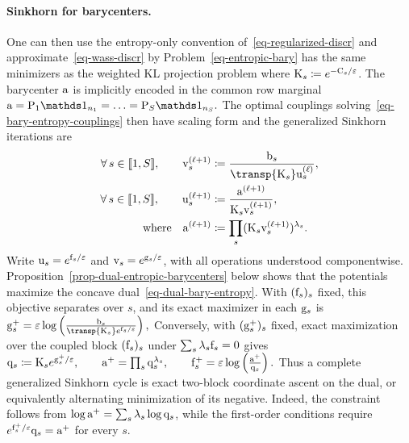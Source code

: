 \paragraph{Sinkhorn for barycenters.}
One can then use the entropy-only convention of~\eqref{eq-regularized-discr} and approximate~\eqref{eq-wass-discr} by
Problem~\eqref{eq-entropic-bary} has the same minimizers as the weighted KL projection problem
where $\mathrm{K}_s\coloneqq e^{-\mathrm{C}_s/\varepsilon}$. The barycenter $\mathrm{a}$ is implicitly encoded in the common row marginal
\(\a=\P_1\ones_{n_1}=\ldots=\P_S\ones_{n_S}.\)
The optimal couplings solving~\eqref{eq-bary-entropy-couplings} then have scaling form
and the generalized Sinkhorn iterations are
\begin{align}
\foralls s\in\range{1,S},\qquad
\itt{\vD}_s
&\eqdef
\frac{\b_s}{\transp{\K_s}\it{\uD}_s},
\label{eq-sinkhorn-bary}
\\
\foralls s\in\range{1,S},\qquad
\itt{\uD}_s
&\eqdef
\frac{\itt{\a}}{\K_s\itt{\vD}_s},
\label{eq-sinkhorn-bary-2}
\\
\qwhereq
\itt{\a}
&\eqdef
\prod_s(\K_s\itt{\vD}_s)^{\la_s}.
\label{eq-sinkhorn-bary-3}
\end{align}
Write
\(\mathrm{u}_s=e^{\mathrm{f}_s/\varepsilon}\) and \(\mathrm{v}_s=e^{\mathrm{g}_s/\varepsilon}\), with all operations understood componentwise. Proposition~\ref{prop-dual-entropic-barycenters} below shows that the potentials maximize the concave dual~\eqref{eq-dual-bary-entropy}. With $(\mathrm{f}_s)_s$ fixed, this objective separates over $s$, and its exact maximizer in each $\mathrm{g}_s$ is
\(\gD_s^+ = \epsilon\log\pa{\frac{\b_s}{\transp{\K_s}e^{\fD_s/\epsilon}}},\)
Conversely, with $(\mathrm{g}_s^+)_s$ fixed, exact maximization over the coupled block $(\mathrm{f}_s)_s$ under $\sum_s\lambda_s\mathrm{f}_s=0$ gives
\(\mathrm{q}_s \coloneqq \mathrm{K}_s e^{\mathrm{g}_s^+/\varepsilon}, \qquad \mathrm{a}^+ = \prod_s\mathrm{q}_s^{\lambda_s}, \qquad \mathrm{f}_s^+ = \varepsilon\log\left( \frac{\mathrm{a}^+}{\mathrm{q}_s} \right).\)
Thus a complete generalized Sinkhorn cycle is exact two-block coordinate ascent on the dual, or equivalently alternating minimization of its negative. Indeed, the constraint follows from $\log\mathrm{a}^+=\sum_s\lambda_s\log\mathrm{q}_s$, while the first-order conditions require $e^{\mathrm{f}_s^+/\varepsilon}\mathrm{q}_s=\mathrm{a}^+$ for every $s$.

